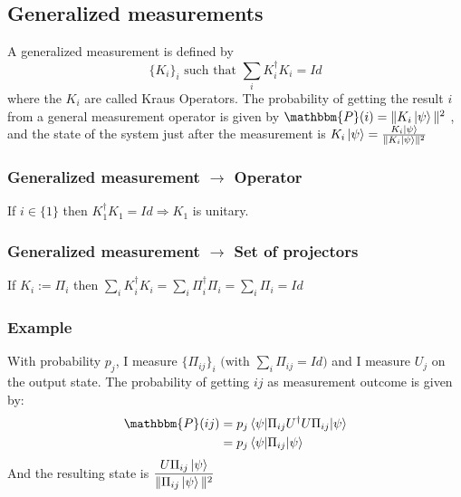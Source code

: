 \documentclass{article}
\begin{document}
\subsection{Generalized measurements}
A generalized measurement is defined by
\begin{equation}
    \{K_i\}_i \text{ such that } \sum_i K_i^\dagger K_i=Id
\end{equation}
where the $K_i$ are called Kraus Operators. The probability of getting the
result $i$ from a general measurement operator is given by $\mathbbm{P}(i) =
\|K_i\ket{\psi}\|^2$ , and the state of the system just after the measurement is
$K_i\ket{\psi}=\frac{K_i\ket{\psi}}{\|K_i\ket{\psi}\|^2}$

\subsubsection*{Generalized measurement $\rightarrow$ Operator}
If $i \in \{1\}$ then $K_1^\dagger K_1=Id \Rightarrow K_1$ is
unitary.%

\subsubsection*{Generalized measurement $\rightarrow$ Set of projectors}
If $K_i := \Pi_i$ then $\sum_i K_i^\dagger K_i = \sum_i \Pi_i^\dagger\Pi_i =
\sum_i \Pi_i = Id$

\subsubsection*{Example}
With probability $p_j$, I measure $\{\Pi_{ij}\}_i \text{ (with } \sum_i \Pi_{ij} = Id)$ and
I measure $U_j$ on the output state.
The probability of getting $ij$ as measurement outcome is given by:
\begin{equation}
    \begin{aligned}
        \mathbbm{P}(ij)
            &= p_j\braket{\psi | \Pi_{ij} U^\dagger U \Pi_{ij} | \psi} \\
            &= p_j\braket{\psi|\Pi_{ij}|\psi}
    \end{aligned}
\end{equation}
\noindent
And the resulting state is
$\dfrac{U\Pi_{ij}\ket{\psi}}{\|\Pi_{ij}\ket{\psi}\|^2}$
\end{document}
